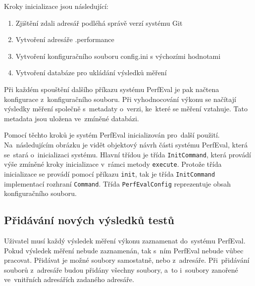 Kroky inicializace jsou následující:
\begin{enumerate}
    \item Zjištění zdali adresář podléhá správě verzí systému Git
    \item Vytvoření adresáře .performance
    \item Vytvoření konfiguračního souboru config.ini s výchozími hodnotami
    \item Vytvoření databáze pro ukládání výsledků měření
\end{enumerate}

Při každém spouštění dalšího příkazu systému PerfEval je pak načtena konfigurace z~konfiguračního souboru.
Při vyhodnocování výkonu se načítají výsledky měření společně s~metadaty o~verzi, ke~které se měření vztahuje.
Tato metadata jsou uložena ve~zmíněné databázi.

Pomocí těchto kroků je systém PerfEval inicializován pro~další použití.
Na~následujícím obrázku je vidět objektový návrh části systému PerfEval, která se~stará o~inicializaci systému.
Hlavní třídou je třída \lstinline|InitCommand|, která provádí výše zmíněné kroky inicializace v~rámci metody \lstinline|execute|.
Protože třída inicializace se provádí pomocí příkazu \texttt{init}, tak je třída \lstinline|InitCommand| implementací rozhraní \lstinline|Command|.
Třída \lstinline|PerfEvalConfig| reprezentuje obsah konfiguračního souboru.


\subsection{Přidávání nových výsledků testů}

Uživatel musí každý výsledek měření výkonu zaznamenat do~systému PerfEval. Pokud výsledek měření nebude zaznamenán, tak s~ním
PerfEval nebude vůbec pracovat. Přidávat je možné soubory samostatně, nebo z~adresáře. Při~přidávání souborů z~adresáře budou
přidány všechny soubory, a~to i~soubory zanořené ve~vnitřních adresářích zadaného adresáře.

